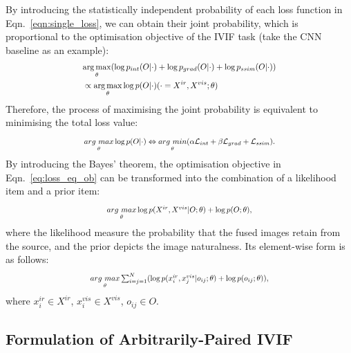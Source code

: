 By introducing the statistically independent probability of each loss function in Eqn.~\eqref{eqn:single_loss}, we can obtain their joint probability, which is proportional to the optimisation objective of the IVIF task (take the CNN baseline as an example):
\vspace{-2mm}
\begin{equation}
\scalebox{0.85}{
$\begin{split}
     &\underset{\theta}{\arg \max}(\log p_{int}(O|\cdot) +\log p_{grad}(O|\cdot)+\log p_{ssim}(O|\cdot))
     \\
      &\propto \underset{\theta}{\arg \max}\log p(O|\cdot) (\cdot = X^{ir},X^{vis};\theta)  
\end{split}$
}
  \label{eq:loss_pro_ob}
\end{equation}
Therefore, the process of maximising the joint probability is equivalent to minimising the total loss value: 
\vspace{-2mm}
\begin{equation}
\scalebox{0.8}{$\underset{\theta}{arg\ max}\log p(O|\cdot) \Leftrightarrow\underset{\theta}{arg\ min} (\alpha  \mathcal{L}_{int}+\beta \mathcal{L}_{grad} +\mathcal{L}_{ssim}).
  \label{eq:loss_eq_ob}$}
\end{equation}
By introducing the Bayes' theorem, the optimisation objective in Eqn.~\eqref{eq:loss_eq_ob} can be transformed into the combination of a likelihood item and a prior item: 
\begin{equation}
\scalebox{0.8}{$\underset{\theta}{arg\ max}\log p(X^{ir},X^{vis}|O;\theta)+\log p(O;\theta),$}
\end{equation}
where the likelihood measure the probability that the fused images retain from the source, and the prior depicts the image naturalness.
Its element-wise form is as follows: 
\begin{equation}
\scalebox{0.8}{$\underset{\theta  }{arg\ max}\sum_{i=j=1}^{N}(\log p(x_{i}^{ir},x_{j}^{vis}|o_{ij};\theta  ) +\log p(o_{ij};\theta )),
  \label{eq:pair_ob}$}
\end{equation}
where $x_{i}^{ir}\in X^{ir}$, $x_{i}^{vis}\in X^{vis} $, $o_{ij}\in O$.


\subsection{Formulation of Arbitrarily-Paired IVIF}

